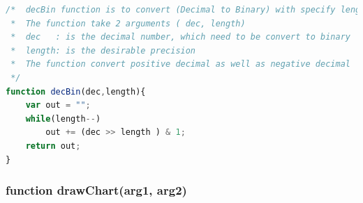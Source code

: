 \documentclass[11pt]{article}
\begin{document}
\begin{lstlisting}[label={lst:decBin}, language=Javascript, caption={Convert (Decimal to Binary) with specify length of the output},]
/*	decBin function is to convert (Decimal to Binary) with specify length of the output.
 *	The function take 2 arguments ( dec, length)
 *	dec   : is the decimal number, which need to be convert to binary
 *	length: is the desirable precision 
 *	The function convert positive decimal as well as negative decimal 
 */
function decBin(dec,length){
	var out = "";
	while(length--)
		out += (dec >> length ) & 1;
	return out;
}
\end{lstlisting}

\subsubsection{function drawChart(arg1, arg2) }
\end{document}
